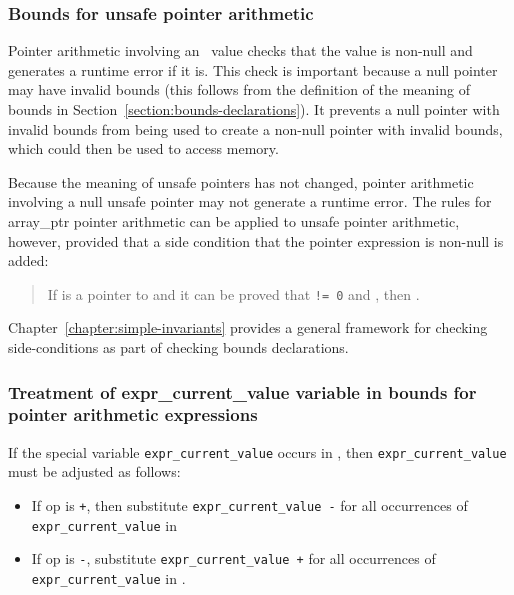 \subsubsection{Bounds for unsafe pointer arithmetic}

Pointer arithmetic involving an \arrayptr\ value checks that
the value is non-null and generates a runtime error if it is. This check
is important because a null pointer may have invalid bounds (this
follows from the definition of the meaning of bounds in 
Section~\ref{section:bounds-declarations}). It
prevents a null pointer with invalid bounds from being used to create a
non-null pointer with invalid bounds, which could then be used to access
memory.

Because the meaning of unsafe pointers has not changed, pointer
arithmetic involving a null unsafe pointer may not generate a runtime
error. The rules for array\_ptr pointer arithmetic can be applied to
unsafe pointer arithmetic, however, provided that a side condition that
the pointer expression is non-null is added:

\begin{quote}
If  is a pointer to  and it can be proved that
 \texttt{!= 0} and 
, then
.
\end{quote}

Chapter~\ref{chapter:simple-invariants}
provides a general framework for checking side-conditions as
part of checking bounds declarations.

\subsubsection{Treatment of expr\_current\_value variable in bounds for
pointer arithmetic expressions}

If the special variable \texttt{expr\_current\_value} occurs in
, then
\texttt{expr\_current\_value} must be adjusted as follows:

\begin{itemize}
\item
  If op is \texttt{+}, then substitute \texttt{expr\_current\_value -}
   for all occurrences of \texttt{expr\_current\_value} in
\item
  If op is \texttt{-}, substitute \texttt{expr\_current\_value +}
   for all occurrences of \texttt{expr\_current\_value} in
  .
\end{itemize}

